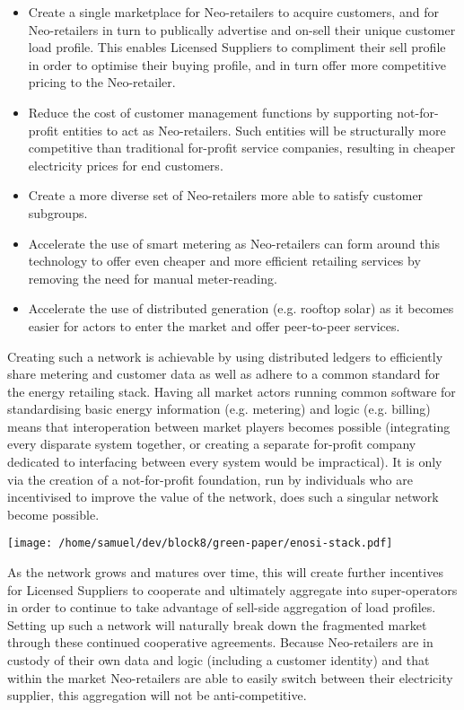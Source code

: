 \documentclass{article}
\theoremstyle{definition}
\theoremstyle{plain} %
\begin{document}
\begin{itemize}
\item{Create a single marketplace for Neo-retailers to acquire customers, and for Neo-retailers in turn to publically advertise and on-sell their unique customer load profile. This enables Licensed Suppliers to compliment their sell profile in order to optimise their buying profile, and in turn offer more competitive pricing to the Neo-retailer.}
\item{Reduce the cost of customer management functions by supporting not-for-profit entities to act as Neo-retailers. Such entities will be structurally more competitive than traditional for-profit service companies, resulting in cheaper electricity prices for end customers.}
\item{Create a more diverse set of Neo-retailers more able to satisfy customer subgroups.}
\item{Accelerate the use of smart metering as Neo-retailers can form around this technology to offer even cheaper and more efficient retailing services by removing the need for manual meter-reading.}
\item{Accelerate the use of distributed generation (e.g. rooftop solar) as it becomes easier for actors to enter the market and offer peer-to-peer services.}
\end{itemize} 

\noindent Creating such a network is achievable by using distributed ledgers to efficiently share metering and customer data as well as adhere to a common standard for the energy retailing stack. Having all market actors running common software for standardising basic energy information (e.g. metering) and logic (e.g. billing) means that interoperation between market players becomes possible (integrating every disparate system together, or creating a separate for-profit company dedicated to interfacing between every system would be impractical). It is only via the creation of a not-for-profit foundation, run by individuals who are incentivised to improve the value of the network, does such a singular network become possible. \\

\vspace{2mm}
\begin{center}
\texttt{[image: /home/samuel/dev/block8/green-paper/enosi-stack.pdf]}
\end{center}
\vspace{3mm}

\noindent As the network grows and matures over time, this will create further incentives for Licensed Suppliers to cooperate and ultimately aggregate into super-operators in order to continue to take advantage of sell-side aggregation of load profiles. Setting up such a network will naturally break down the fragmented market through these continued cooperative agreements. Because Neo-retailers are in custody of their own data and logic (including a customer identity) and that within the market Neo-retailers are able to easily switch between their electricity supplier, this aggregation will not be anti-competitive. \\
\end{document}
